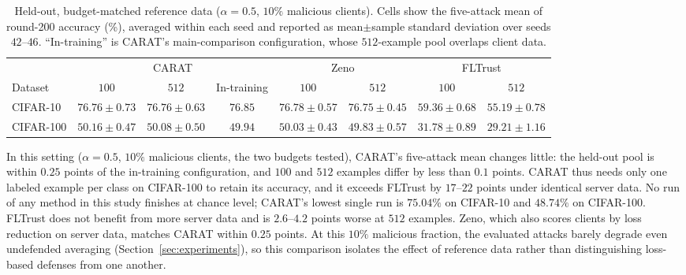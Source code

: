 \begin{table}[!htbp]
  \centering
  \caption{Held-out, budget-matched reference data ($\alpha=0.5$, $10\%$ malicious clients). Cells show the five-attack mean of round-200 accuracy (\%), averaged within each seed and reported as mean$\pm$sample standard deviation over seeds $42$--$46$. ``In-training'' is CARAT's main-comparison configuration, whose $512$-example pool overlaps client data.}
  \label{tab:reference-control}
  \small
  \setlength{\tabcolsep}{5pt}
  \begin{tabular}{lccccccc}
  \toprule
  & \multicolumn{3}{c}{CARAT} & \multicolumn{2}{c}{Zeno} & \multicolumn{2}{c}{FLTrust} \\
  \cmidrule(lr){2-4}\cmidrule(lr){5-6}\cmidrule(lr){7-8}
  Dataset & $100$ & $512$ & In-training & $100$ & $512$ & $100$ & $512$ \\
  \midrule
  CIFAR-10 & $76.76\pm0.73$ & $76.76\pm0.63$ & $76.85$ & $76.78\pm0.57$ & $76.75\pm0.45$ & $59.36\pm0.68$ & $55.19\pm0.78$ \\
  CIFAR-100 & $50.16\pm0.47$ & $50.08\pm0.50$ & $49.94$ & $50.03\pm0.43$ & $49.83\pm0.57$ & $31.78\pm0.89$ & $29.21\pm1.16$ \\
  \bottomrule
  \end{tabular}
\end{table}

In this setting ($\alpha=0.5$, $10\%$ malicious clients, the two budgets tested), CARAT's five-attack mean changes little: the held-out pool is within $0.25$ points of the in-training configuration, and $100$ and $512$ examples differ by less than $0.1$ points. CARAT thus needs only one labeled example per class on CIFAR-100 to retain its accuracy, and it exceeds FLTrust by $17$--$22$ points under identical server data. No run of any method in this study finishes at chance level; CARAT's lowest single run is $75.04\%$ on CIFAR-10 and $48.74\%$ on CIFAR-100. FLTrust does not benefit from more server data and is $2.6$--$4.2$ points worse at $512$ examples. Zeno, which also scores clients by loss reduction on server data, matches CARAT within $0.25$ points. At this $10\%$ malicious fraction, the evaluated attacks barely degrade even undefended averaging (Section~\ref{sec:experiments}), so this comparison isolates the effect of reference data rather than distinguishing loss-based defenses from one another.

